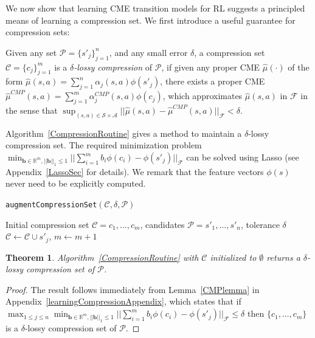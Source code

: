 \documentclass[letterpaper]{article}
\newtheorem{theorem}{Theorem}[section]
\newenvironment{definition}[1][Definition]{\begin{trivlist}
\item[\hskip \labelsep {\bfseries #1}]}{\end{trivlist}}
\newcommand{\cC}{{\mathcal C}}
\newcommand{\cF}{{\mathcal F}}
\newcommand{\cA}{{\mathcal A}}
\newcommand{\cS}{{\mathcal S}}
\newcommand{\cP}{{\mathcal P}}
\newcommand{\R}{{\mathbb R}}
\begin{document}
We now show that learning CME transition models for RL suggests a principled means of learning a compression set. We first introduce a useful guarantee for compression sets:

\begin{definition} \label{lossyCompression}
Given any set $\cP = \{s'_j\}_{j=1}^n$, and any small error $\delta$, a compression set $\cC=\{c_j\}_{j=1}^m$ is a \emph{$\delta$-lossy compression} of $\cP$, if given any proper CME $\hat\mu(\cdot)$ of the form $\hat\mu(s,a) = \sum_{j=1}^n \alpha_j(s,a) \phi(s'_j)$, there exists a proper CME $\hat\mu^{CMP}(s,a) = \sum_{j=1}^m \alpha^{CMP}_j(s,a) \phi(c_j)$, which approximates $\hat\mu(s,a)$ in $\cF$ in the sense that $\sup_{(s,a)\in\cS\times\cA}||\hat\mu(s,a) - \hat\mu^{CMP}(s,a)||_\cF < \delta$.
\end{definition}

Algorithm~\ref{CompressionRoutine} gives a method to maintain a $\delta$-lossy compression set. The required minimization problem $\min_{{\bm b}\in\R^m , ||{\bm b}||_1\le 1} ||\sum_{i=1}^m b_i \phi(c_i) - \phi(s'_j)||_{\cF}$ can be solved using Lasso (see Appendix~\ref{LassoSec} for details). We remark that the feature vectors $\phi(s)$ never need to be explicitly computed.

\begin{algorithm}[htb]
   \caption{\texttt{augmentCompressionSet}$(\cC,\delta,\cP)$}
   \label{CompressionRoutine}
\begin{algorithmic}
     Initial compression set $\cC = {c_1,...,c_m}$, candidates $\cP = {s'_1,...,s'_n}$, tolerance $\delta$
	 \IF {$\min_{{\bm b}\in\R^m , ||{\bm b}||_1\le 1}\hspace{-0.6mm} ||\sum_{i=1}^m b_i \phi(c_i) \hspace{-0.6mm}-\hspace{-0.6mm} \phi(s'_j)||_{\cF} \hspace{-0.6mm}>\hspace{-0.6mm} \delta$}
	  $\cC \leftarrow \cC \cup s'_j$, $m\leftarrow m+1$
   \ENDIF
	\ENDFOR
\end{algorithmic}
\end{algorithm}

\begin{theorem} \label{CompressionTheorem}
Algorithm~\ref{CompressionRoutine} with $\cC$ initialized to $\emptyset$ returns a $\delta$-lossy compression set of $\cP$.
\end{theorem}
\begin{proof} The result follows immediately from Lemma~\ref{CMPlemma} in Appendix~\ref{learningCompressionAppendix},
which states that if $\max_{1\le j \le n } \min_{{\bm b}\in\R^m , ||{\bm b}||_1\le 1}
 ||\sum_{i=1}^m b_i \phi(c_i)-\phi(s'_j)||_{\cF}\le \delta$ then $\{c_1,\dots,c_m\}$ is a $\delta$-lossy compression set of $\cP$.
\end{proof}
\end{document}
